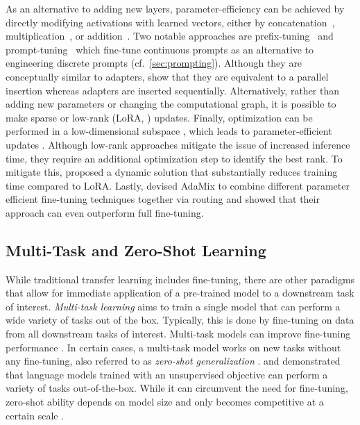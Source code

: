 As an alternative to adding new layers, parameter-efficiency can be achieved by directly modifying activations with learned vectors, either by concatenation~\citep{liu2021gpt, li-liang-2021-prefix, lester2021power}, multiplication~\citep{liu2022few}, or addition~\citep{zaken2021bitfit}. Two notable approaches are prefix-tuning~\citep{li-liang-2021-prefix} and prompt-tuning~\citep{lester2021power} which fine-tune continuous prompts as an alternative to engineering discrete prompts (cf.~\ref{sec:prompting}).
Although they are conceptually similar to adapters, \citet{he2022towards} show that they are equivalent to a parallel insertion whereas adapters are inserted sequentially. Alternatively, rather than adding new parameters or changing the computational graph, it is possible to make sparse \cite{sung2021training,guo2021parameter} or low-rank (LoRA, \citealt{hu2022lora}) updates. Finally, optimization can be performed in a low-dimensional subspace \cite{li2018measuring}, which leads to parameter-efficient updates \cite{aghajanyan2021intrinsic}. Although low-rank approaches mitigate the issue of increased inference time, they require an additional optimization step to identify the best rank. To mitigate this, \citet{valipourdylora} proposed a dynamic solution that substantially reduces training time compared to LoRA. Lastly, \citet{wang-etal-2022-adamix} devised AdaMix to combine different parameter efficient fine-tuning techniques together via routing and showed that their approach can even outperform full fine-tuning.

\subsection{Multi-Task and Zero-Shot Learning}

While traditional transfer learning includes fine-tuning, there are other paradigms that allow for immediate application of a pre-trained model to a downstream task of interest.
\textit{Multi-task learning} \cite{caruana1997multitask,ruder2017overview} aims to train a single model that can perform a wide variety of tasks out of the box. Typically, this is done by fine-tuning on data from all downstream tasks of interest. Multi-task models can improve fine-tuning performance \cite{raffel2019exploring,aghajanyan2021muppet,aribandi2021ext5,liu2022few}. In certain cases, a multi-task model works on new tasks without any fine-tuning, also referred to as \textit{zero-shot generalization} \cite{sanh2022multitask,wei2022finetuned}.
\citet{radford2017learning,radford2019language} and \citet{brown2020language} demonstrated that language models trained with an unsupervised objective can perform a variety of tasks out-of-the-box. While it can circumvent the need for fine-tuning, zero-shot ability depends on model size and only becomes competitive at a certain scale \citep{wei_emergent_2022}.


